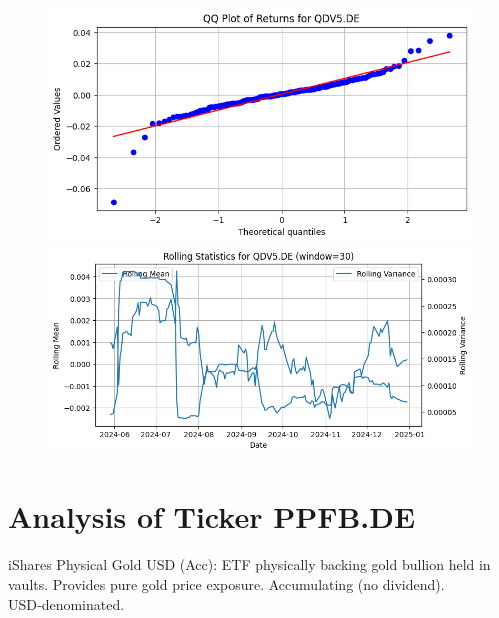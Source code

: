 \documentclass{article}%
\begin{document}
%


\begin{figure}[htbp]%
\begin{minipage}{0.48\textwidth}%
\includegraphics[width=\linewidth]{ticker_images/QDV5.DE_qq_plot.png}%
\end{minipage}%
\begin{minipage}{0.48\textwidth}%
\includegraphics[width=\linewidth]{ticker_images/QDV5.DE_rolling_stats.png}%
\end{minipage}%
\end{figure}

%
\section*{Analysis of Ticker PPFB.DE}%
\label{sec:AnalysisofTickerPPFB.DE}%
iShares Physical Gold USD (Acc): ETF physically backing gold bullion held in vaults. Provides pure gold price exposure. Accumulating (no dividend). USD‑denominated.%
\end{document}
